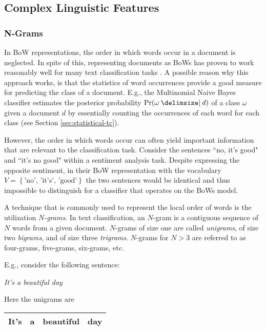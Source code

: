 \subsection{Complex Linguistic Features}
\label{sec:complex-ling-feat}

\subsubsection{N-Grams}
\label{sssec:n-grams}
In BoW representations, the order in which words occur in a document is
neglected. In spite of this, representing documents as BoWs has proven
to work reasonably well for many text classification tasks \cite{mccallum1998comparison}. 
A possible reason why this approach works, is that the statistics of word occurrences provide a good measure for predicting
the class of a document. E.g., the Multinomial Naive Bayes classifier estimates the
posterior probability $\Pr(\omega\given d)$ of a class $\omega$ given a document $d$ by essentially counting the occurrences 
of each word for each class (see Section \ref{sec:statistical-tc}).

However, the order in which words occur can often yield important information
that are relevant to the classification task. Consider the sentences ``no,
it's good" and ``it's no good" within a sentiment analysis task. Despite
expressing the opposite sentiment, in their BoW representation
with the vocabulary $V = \left\{\text{'no', 'it's', 'good'} \right\}$ 
the two sentences would be identical and thus impossible to distinguish for a
classifier that operates on the BoWs model.

A technique that is commonly used to represent the local order
of words is the utilization \emph{$N$-grams}. In text classification, an $N$-gram is
a contiguous sequence of $N$ words from a given document. $N$-grams of size one are called
\emph{unigrams}, of size two \emph{bigrams}, and of size three \emph{trigrams}.
$N$-grams for $N > 3$ are referred to as four-grams, five-grams, six-grams, etc.

E.g., consider the following sentence:

\begin{center}
\textit{It's a beautiful day}
\end{center}

Here the unigrams are

\begin{center}
\begin{tabular}{|c|c|c|c|}
\hline
It's & a & beautiful & day \\
\hline
\end{tabular}
\end{center}

